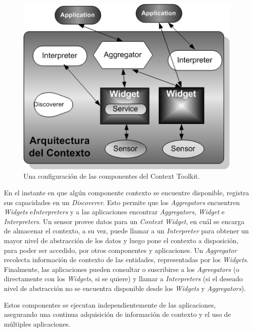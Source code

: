 \begin{figure}
\begin{center}
 \includegraphics [width=5 in,totalheight=4 in] {Ch1/f2.jpg}
\caption {Una configuración de las componentes del Context Toolkit.}
\label{fig:deytoolkit}
\end{center}
\end{figure}

En el instante en que algún componente contexto se encuentre disponible,
registra sus capacidades en un \textit{Discoverer}. Esto permite que los \textit{Aggregators}
encuentren \textit{Widgets} e\textit{Interpreters} y a las aplicaciones encontrar \textit{Aggregators}, \textit{Widget} e \textit{Interpreters}. Un sensor provee datos para un \textit{Context Widget}, en cuál se encarga de almacenar el contexto, a su vez, puede llamar a un \textit{Interpreter} para obtener un mayor nivel de abstracción de los datos y luego pone el contexto a disposición, para poder ser accedido,  por otros componentes y aplicaciones. Un \textit{Aggregator} recolecta información de contexto de las entidades, representadas por los \textit{Widgets}. Finalmente, las aplicaciones pueden consultar o suscribirse a los \textit{Agreegators} (o directamente con los \textit{Widgets}, si se quiere) y llamar a \textit{Interpreters} (si el deseado nivel de abstracción no se encuentra disponible desde los
\textit{Widgets} y \textit{Aggregators}).

Estos componentes se ejecutan independientemente de las aplicaciones, asegurando una continua adquisición de información de contexto y el uso de múltiples aplicaciones.

